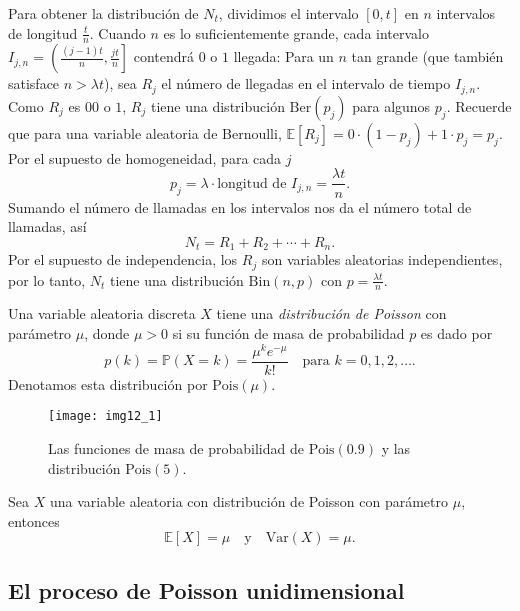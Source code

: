 	\noindent Para obtener la distribución de $N_{t}$, dividimos el intervalo $\left[0,t\right]$ en $n$ intervalos de longitud $\tfrac{t}{n}$. Cuando $n$ es lo suficientemente grande, cada intervalo $I_{j,n}=\left(\tfrac{\left(j-1\right)t}{n},\tfrac{jt}{n}\right]$ contendrá $0$ o $1$ llegada: Para un $n$ tan grande (que también satisface $n>\lambda t$), sea $R_{j}$ el número de llegadas en el intervalo de tiempo $I_{j,n}$. Como $R_{j}$ es $0$0 o $1$, $R_{j}$ tiene una distribución $\mathrm{Ber}\left(p_{j}\right)$ para algunos $p_{j}$. Recuerde que para una variable aleatoria de Bernoulli, $\mathds{E}\left[R_{j}\right]=0\cdot\left(1-p_{j}\right)+1\cdot p_{j}=p_{j}$. Por el supuesto de homogeneidad, para cada $j$
	\[
		p_{j}=\lambda\cdot\text{longitud de }I_{j,n}=\frac{\lambda t}{n}.
	\]
	Sumando el número de llamadas en los intervalos nos da el número total de llamadas, así
	\[
		N_{t}=R_{1}+R_{2}+\cdots+R_{n}.
	\]
	Por el supuesto de independencia, los $R_{j}$ son variables aleatorias independientes, por lo tanto, $N_{t}$ tiene una distribución $\mathrm{Bin}\left(n,p\right)$ con $p=\tfrac{\lambda t}{n}$.

	\begin{definition}
		Una variable aleatoria discreta $X$ tiene una \textit{distribución de Poisson} con parámetro $\mu$, donde $\mu>0$ si su función de masa de probabilidad $p$ es dado por
	\[
		p\left(k\right)=\mathds{P}\left(X=k\right)=\frac{\mu^{k}e^{-\mu}}{k!}\quad\text{para }k=0,1,2,\ldots.
	\]
	Denotamos esta distribución por $\mathrm{Pois}\left(\mu\right)$.
	\end{definition}

	\begin{figure}[!ht]
		\centering
		\texttt{[image: img12\_1]}
		\caption*{Las funciones de masa de probabilidad de $\mathrm{Pois}\left(\num{0.9}\right)$ y las distribución $\mathrm{Pois}\left(\num{5}\right)$.}
	\end{figure}

	\begin{theorem}
		Sea $X$ una variable aleatoria con distribución de Poisson con parámetro $\mu$, entonces
		\[
			\mathds{E}\left[X\right]=\mu\quad\text{y}\quad\mathrm{Var}\left(X\right)=\mu.
		\]
	\end{theorem}

\subsection{El proceso de Poisson unidimensional}

